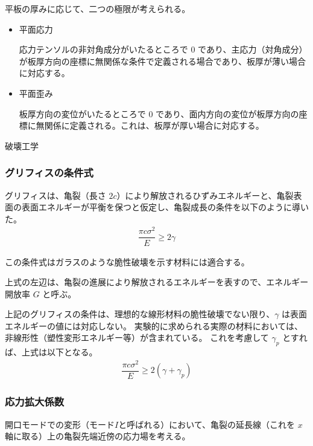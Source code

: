 \documentclass[11pt,a4paper]{jsarticle}
\makeatletter
\def\subsection{\@startsection 
{subsection}
{1}
{\z@}
{3.5ex plus -1ex minus -.2ex}
{1.ex plus .2ex}
{\large\bf}
}
\makeatother
\begin{document}
平板の厚みに応じて、二つの極限が考えられる。

\begin{itemize}
\item
平面応力

応力テンソルの非対角成分がいたるところで 0 であり、主応力（対角成分）が板厚方向の座標に無関係な条件で定義される場合であり、板厚が薄い場合に対応する。

\item
平面歪み

板厚方向の変位がいたるところで 0 であり、面内方向の変位が板厚方向の座標に無関係に定義される。これは、板厚が厚い場合に対応する。

\end{itemize}

\subsection{破壊工学}


\subsubsection{グリフィスの条件式}


グリフィスは、亀裂（長さ $2c$）により解放されるひずみエネルギーと、亀裂表面の表面エネルギーが平衡を保つと仮定し、亀裂成長の条件を以下のように導いた。
\begin{align}
\dfrac{\pi c\sigma^2}{E} \geq 2 \gamma
\end{align}

この条件式はガラスのような脆性破壊を示す材料には適合する。

上式の左辺は、亀裂の進展により解放されるエネルギーを表すので、エネルギー開放率 $G$ と呼ぶ。

上記のグリフィスの条件は、理想的な線形材料の脆性破壊でない限り、$\gamma$ は表面エネルギーの値には対応しない。
実験的に求められる実際の材料においては、非線形性（塑性変形エネルギー等）が含まれている。
これを考慮して $\gamma_p$ とすれば、上式は以下となる。
\begin{align}
\dfrac{\pi c\sigma^2}{E} \geq 2 (\gamma+\gamma_p)
\label{Gr}
\end{align}


\subsubsection{応力拡大係数}
開口モードでの変形（モード$I$と呼ばれる）において、亀裂の延長線（これを $x$ 軸に取る）上の亀裂先端近傍の応力場を考える。
\end{document}
